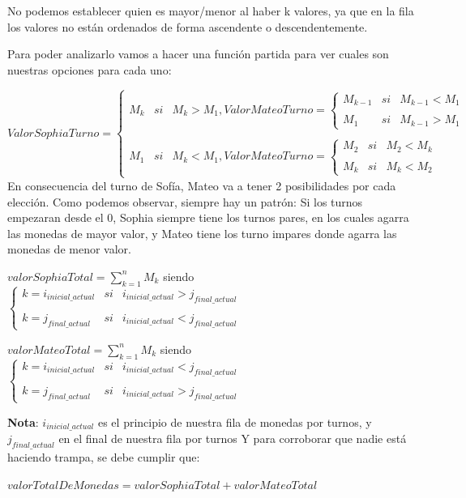 No podemos establecer quien es mayor/menor al haber k valores, ya que en la fila los valores no están ordenados de forma ascendente o descendentemente.

Para poder analizarlo vamos a hacer una función partida para ver cuales son nuestras opciones para cada uno:

$ValorSophiaTurno= \left\{ \begin{array}{lcc} M_{k} & si & M_{k}>M_{1} , ValorMateoTurno= \left\{ \begin{array}{lcc} M_{k-1} & si & M_{k-1}<M_{1} \\ \\ M_{1} & si & M_{k-1} > M_{1} \end{array} \right. \\ \\ M_{1} & si & M_{k} < M_{1}, ValorMateoTurno= \left\{ \begin{array}{lcc} M_{2} & si & M_{2}<M_{k} \\ \\ M_{k} & si & M_{k} < M_{2} \end{array} \right. \end{array} \right.$
\vskip0.3cm
En consecuencia del turno de Sofía, Mateo va a tener 2 posibilidades por cada elección.
\vskip0.7cm
Como podemos observar, siempre hay un patrón: Si los turnos empezaran desde el 0, Sophia siempre tiene los turnos pares, en los cuales agarra las monedas de mayor valor, y Mateo tiene los turno impares donde agarra las monedas de menor valor.

\vskip0.5cm

\vskip0.5cm
$valorSophiaTotal =  \sum_{k=1}^{n}M_{k}$ siendo $\left\{ \begin{array}{lcc} k=i_{inicial\_actual} & si & i_{inicial\_actual}>j_{final\_actual} \\ \\ k=j_{final\_actual} & si & i_{inicial\_actual}<j_{final\_actual} \end{array} \right.$

\vskip0.5cm
$valorMateoTotal =  \sum_{k=1}^{n}M_{k}$ siendo $\left\{ \begin{array}{lcc} k=i_{inicial\_actual} & si & i_{inicial\_actual}<j_{final\_actual} \\ \\ k=j_{final\_actual} & si & i_{inicial\_actual}>j_{final\_actual} \end{array} \right.$

\vskip0.5cm
\textbf{Nota}: $i_{inicial\_actual}$ es el principio de nuestra fila de monedas por turnos, y $j_{final\_actual}$ en el final de nuestra fila por turnos 
\vskip0.8cm
Y para corroborar que nadie está haciendo trampa, se debe cumplir que:
\vskip0.5cm
\begin{center}
    $valorTotalDeMonedas=valorSophiaTotal+valorMateoTotal$
\end{center}


